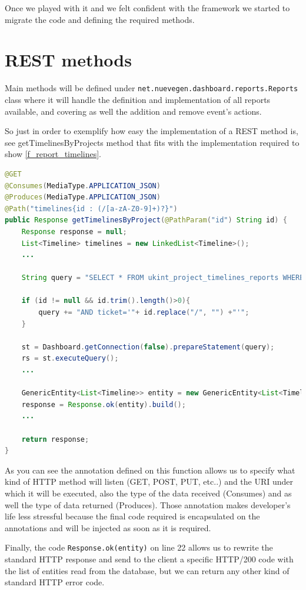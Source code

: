 Once we played with it and we felt confident with the framework we started
to migrate the code and defining the required methods.

\section{REST methods}
Main methods will be defined under
\texttt{net.nuevegen.dashboard.reports.Reports} class where it will handle
the definition and implementation of all reports available, and covering as well
the addition and remove event's actions. 

So just in order to exemplify how easy the implementation of a REST method is,
see getTimelinesByProjects method that fits with the implementation required to
show \ref{f_report_timelines}.\\

\begin{lstlisting}[language=Java,breaklines=true,caption=Reports.getTimelinesByProjects(),label=f_migration_gettimelines]
@GET
@Consumes(MediaType.APPLICATION_JSON)
@Produces(MediaType.APPLICATION_JSON)
@Path("timelines{id : (/[a-zA-Z0-9]+)?}")
public Response getTimelinesByProject(@PathParam("id") String id) {
	Response response = null;
	List<Timeline> timelines = new LinkedList<Timeline>(); 
	...

	String query = "SELECT * FROM ukint_project_timelines_reports WHERE 1 ";

	if (id != null && id.trim().length()>0){
		query += "AND ticket='"+ id.replace("/", "") +"'";
	}
	
	st = Dashboard.getConnection(false).prepareStatement(query);
	rs = st.executeQuery();
	...
	
	GenericEntity<List<Timeline>> entity = new GenericEntity<List<Timeline>>(timelines) {};
	response = Response.ok(entity).build();
	...
	
	return response;
}
\end{lstlisting}

As you can see the annotation defined on this function allows us to specify what
kind of HTTP method will listen (GET, POST, PUT, etc..) and the URI under which
it will be executed, also the type of the data received (Consumes) and as well
the type of data returned (Produces). Those annotation makes developer's
life less stressful because the final code required is encapsulated on the
annotations and will be injected as soon as it is required.

Finally, the code \texttt{Response.ok(entity)} on line 22 allows us to rewrite
the standard HTTP response and send to the client a specific HTTP/200 code with the
list of entities read from the database, but we can return any other kind of
standard HTTP error code.


